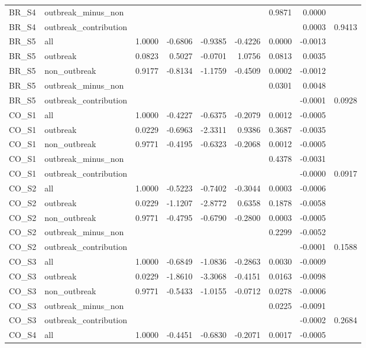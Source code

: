 \begin{tabular}{llrrrrrrr}
BR\_S4 & outbreak\_minus\_non &  &  &  &  & 0.9871 & 0.0000 &  \\
BR\_S4 & outbreak\_contribution &  &  &  &  &  & 0.0003 & 0.9413 \\
BR\_S5 & all & 1.0000 & -0.6806 & -0.9385 & -0.4226 & 0.0000 & -0.0013 &  \\
BR\_S5 & outbreak & 0.0823 & 0.5027 & -0.0701 & 1.0756 & 0.0813 & 0.0035 &  \\
BR\_S5 & non\_outbreak & 0.9177 & -0.8134 & -1.1759 & -0.4509 & 0.0002 & -0.0012 &  \\
BR\_S5 & outbreak\_minus\_non &  &  &  &  & 0.0301 & 0.0048 &  \\
BR\_S5 & outbreak\_contribution &  &  &  &  &  & -0.0001 & 0.0928 \\
CO\_S1 & all & 1.0000 & -0.4227 & -0.6375 & -0.2079 & 0.0012 & -0.0005 &  \\
CO\_S1 & outbreak & 0.0229 & -0.6963 & -2.3311 & 0.9386 & 0.3687 & -0.0035 &  \\
CO\_S1 & non\_outbreak & 0.9771 & -0.4195 & -0.6323 & -0.2068 & 0.0012 & -0.0005 &  \\
CO\_S1 & outbreak\_minus\_non &  &  &  &  & 0.4378 & -0.0031 &  \\
CO\_S1 & outbreak\_contribution &  &  &  &  &  & -0.0000 & 0.0917 \\
CO\_S2 & all & 1.0000 & -0.5223 & -0.7402 & -0.3044 & 0.0003 & -0.0006 &  \\
CO\_S2 & outbreak & 0.0229 & -1.1207 & -2.8772 & 0.6358 & 0.1878 & -0.0058 &  \\
CO\_S2 & non\_outbreak & 0.9771 & -0.4795 & -0.6790 & -0.2800 & 0.0003 & -0.0005 &  \\
CO\_S2 & outbreak\_minus\_non &  &  &  &  & 0.2299 & -0.0052 &  \\
CO\_S2 & outbreak\_contribution &  &  &  &  &  & -0.0001 & 0.1588 \\
CO\_S3 & all & 1.0000 & -0.6849 & -1.0836 & -0.2863 & 0.0030 & -0.0009 &  \\
CO\_S3 & outbreak & 0.0229 & -1.8610 & -3.3068 & -0.4151 & 0.0163 & -0.0098 &  \\
CO\_S3 & non\_outbreak & 0.9771 & -0.5433 & -1.0155 & -0.0712 & 0.0278 & -0.0006 &  \\
CO\_S3 & outbreak\_minus\_non &  &  &  &  & 0.0225 & -0.0091 &  \\
CO\_S3 & outbreak\_contribution &  &  &  &  &  & -0.0002 & 0.2684 \\
CO\_S4 & all & 1.0000 & -0.4451 & -0.6830 & -0.2071 & 0.0017 & -0.0005 &  \\

\end{tabular}
